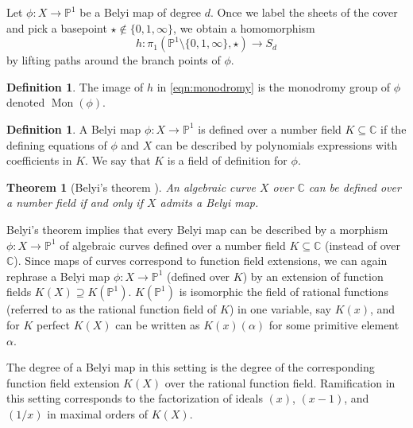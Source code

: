 \documentclass{dcthesis}
\newcommand{\PP}{\mathbb P}
\newcommand{\CC}{\mathbb C}
\newcommand{\defi}[1]{\textsf{#1}}
\DeclareMathOperator{\Mon}{Mon}
\numberwithin{equation}{section}
\newtheorem{theorem}[equation]{Theorem}
\theoremstyle{definition}
\newtheorem{definition}[equation]{Definition}
\theoremstyle{remark}
\begin{document}
{{{    Let $\phi\colon X\to\PP^1$ be a
    Belyi map of degree $d$.
    Once we label the sheets of the cover
    and pick a basepoint
    $\star\not\in\{0,1,\infty\}$,
    we obtain a homomorphism
    \begin{equation}\label{eqn:monodromy}
      h\colon\pi_1(\PP^1\setminus\{0,1,\infty\},
      \star)\to S_d
    \end{equation}
    by lifting paths around the
    branch points of $\phi$.
    \begin{definition}\label{def:monodromy}
      The image of $h$ in \eqref{eqn:monodromy}
      is the \defi{monodromy group} of $\phi$
      denoted $\Mon(\phi)$.
    \end{definition}
    \begin{definition}
      \label{def:definedover}
      A Belyi map
      $\phi\colon X\to\PP^1$
      is \defi{defined over}
      a number field $K\subseteq\CC$
      if the defining equations
      of $\phi$ and $X$
      can be described by
      polynomials expressions
      with coefficients in $K$.
      We say that $K$ is a
      \defi{field of definition}
      for $\phi$.
    \end{definition}
    \begin{theorem}
      [Belyi's theorem \cite{belyi}]
      \label{thm:belyistheorem}
      An algebraic curve $X$ over $\CC$
      can be defined over a number field
      if and only if $X$
      admits a Belyi map.
    \end{theorem}
    Belyi's theorem implies that
    every Belyi map can be described by
    a morphism $\phi\colon X\to\PP^1$
    of algebraic curves
    defined over a number field $K\subseteq\CC$
    (instead of over $\CC$).
    Since maps of curves
    correspond to function field
    extensions,
    we can again rephrase a Belyi map
    $\phi\colon X\to\PP^1$
    (defined over $K$)
    by an extension of function fields
    $K(X)\supseteq K(\PP^1)$.
    $K(\PP^1)$ is isomorphic the field of
    rational functions
    (referred to as the
    \defi{rational function field} of $K$)
    in one variable,
    say $K(x)$,
    and for $K$ perfect
    $K(X)$
    can be written as $K(x)(\alpha)$
    for some primitive element $\alpha$.
    \par
    The degree of a Belyi map
    in this setting
    is the degree of the corresponding
    function field extension $K(X)$
    over the rational function field.
    Ramification in this setting corresponds
    to the factorization of ideals
    $(x)$, $(x-1)$, and $(1/x)$
    in maximal orders of $K(X)$.
}}}
\end{document}
